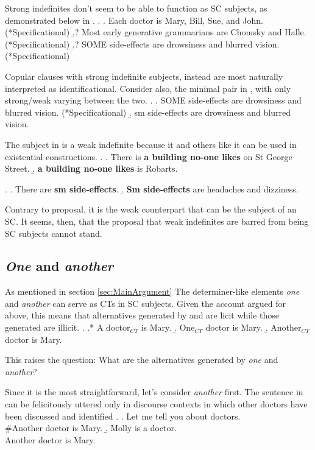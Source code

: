 \documentclass[GPFinal]{subfiles}
\begin{document}
Strong indefinites don't seem to be able to function as SC subjects, as demonstrated below in \Next.
\ex.
\a. Each doctor is Mary, Bill, Sue, and John. (*Specificational)
\b.? Most early generative grammarians are Chomsky and Halle. (*Specificational)
\b.? SOME side-effects are drowsiness and blurred vision. (*Specificational)

Copular clauses with strong indefinite subjects, instead are most naturally interpreted as identificational.
Consider also, the minimal pair in \Next, with only strong/weak varying between the two.
\ex.
\a. SOME side-effects are drowsiness and blurred vision. (*Specificational)
\b. sm side-effects are drowsiness and blurred vision.

The subject in \Last[b] is a weak indefinite because it and others like it can be used in existential constructions.
\ex. 
\a. There is \textbf{a building no-one likes} on St George Street.
\b. \textbf{a building no-one likes} is Robarts.

\ex.
\a. There are \textbf{sm side-effects}.
\b. \textbf{Sm side-effects} are headaches and dizziness. 

Contrary to  proposal, it is the weak counterpart that can be the subject of an SC.
It seems, then, that the proposal that weak indefinites are barred from being SC subjects cannot stand.

\subsection{\textit{One} and \textit{another}}
As mentioned in section \ref{sec:MainArgument} The determiner-like elements \textit{one} and \textit{another} can serve as CTs in SC subjects.
Given the account argued for above, this means that alternatives generated by \Next[b] and \Next[c] are licit while those generated \Next[a] are illicit.
\ex.
\a.* A doctor$_{CT}$ is Mary.
\b.\label{ex:OneCT} One$_{CT}$ doctor is Mary.
\b. Another$_{CT}$ doctor is Mary.

This raises the question: What are the alternatives generated by \textit{one} and \textit{another}?

Since it is the most straightforward, let's consider \textit{another} first.
The sentence in \Last[c] can be felicitously uttered only in discourse contexts in which other doctors have been discussed and identified
\ex.
\a. Let me tell you about doctors.\\
\#Another doctor is Mary.
\b. Molly is a doctor.\\
Another doctor is Mary.
\end{document}
